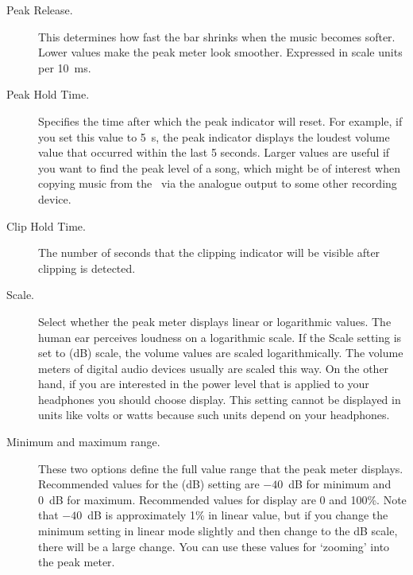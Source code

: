 \begin{description}
\begin{description}
    \item[Peak Release.]
      This determines how fast the bar shrinks when the music becomes
      softer. Lower values make the peak meter look smoother.
      Expressed in scale units per 10~ms.
    \item[Peak Hold Time.]
      Specifies the time after which the peak indicator will reset.
      For example, if you set this value to 5~s, the peak indicator displays
      the loudest volume value that occurred within the last 5 seconds.
      Larger values are useful if you want to find the peak level of a song,
      which might be of interest when copying music from the \dap\ via the
      analogue output to some other recording device.
    \item[Clip Hold Time.]
      The number of seconds that the clipping indicator will be visible
      after clipping is detected.
    \item[Scale.]
      Select whether the peak meter displays linear or logarithmic values.
      The human ear perceives loudness on a logarithmic scale. If the Scale
      setting is set to  (dB) scale, the volume values
      are scaled logarithmically. The volume meters of digital audio
      devices usually are scaled this way. On the other hand, if you
      are interested in the power level that is applied to your headphones
      you should choose  display. This setting cannot be
      displayed in units like volts or watts because such units depend
      on your headphones.
    \item[Minimum and maximum range.]
      These two options define the full value range that the peak meter
      displays. Recommended values for the  (dB) setting
      are $-40$~dB for minimum and 0~dB for maximum. Recommended values
      for  display are 0 and 100\%. Note that $-40$~dB is
      approximately 1\% in linear value, but if you change the minimum
      setting in linear mode slightly and then change to the dB scale,
      there will be a large change. You can use these values for `zooming'
      into the peak meter.
    \end{description}


\end{description}

